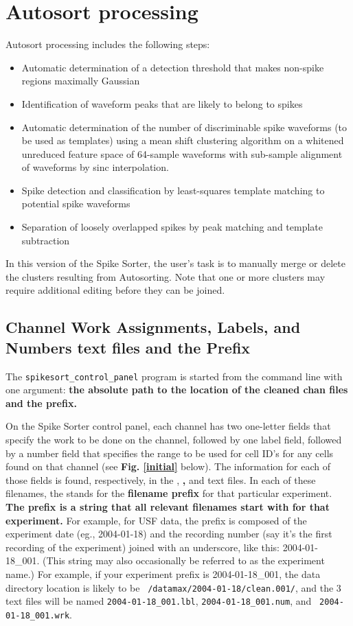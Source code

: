 \documentclass[12pt]{article}
\begin{document}
\section {Autosort processing}

Autosort processing includes the following steps:
\begin{itemize}
\item Automatic determination of a detection threshold that makes
  non-spike regions maximally Gaussian
\item Identification of waveform peaks that are likely to belong to
  spikes
\item Automatic determination of the number of discriminable spike
  waveforms (to be used as templates) using a mean shift clustering
  algorithm \citep{georgescu2003mean} on a whitened unreduced feature
  space of 64-sample waveforms with sub-sample alignment of waveforms
  by sinc interpolation.
\item Spike detection and classification by least-squares template
  matching to potential spike waveforms
\item Separation of loosely overlapped spikes by peak matching and
  template subtraction
\end{itemize}


In this version of the Spike Sorter, the user's task is to manually
merge or delete the clusters resulting from Autosorting. Note that one
or more clusters may require additional editing before they can be
joined.

\subsection {Channel Work Assignments, Labels, and Numbers text files
  and the Prefix}

The {\tt spikesort\_control\_panel} program is started from the
command line with one argument: \textbf{the absolute path to the
  location of the cleaned chan files and the prefix. }


On the Spike Sorter control panel, each channel has two one-letter
fields that specify the work to be done on the channel, followed by
one label field, followed by a number field that specifies the range
to be used for cell ID's for any cells found on that channel (see
\textbf{Fig. \ref{initial}} below). The information for each of those
fields is found, respectively, in the \textbf{},
\textbf{,} and \textbf{} text
files. In each of these filenames, the \textbf{\ttfamily{*}} stands
for the \textbf{filename prefix} for that particular
experiment. \textbf{The prefix is a string that all relevant filenames
  start with for that experiment.} For example, for USF data, the
prefix is composed of the experiment date (eg., 2004-01-18) and the
recording number (say it's the first recording of the experiment)
joined with an underscore, like this: 2004-01-18\_001. (This string
may also occasionally be referred to as the experiment name.) For
example, if your experiment prefix is 2004-01-18\_001, the data
directory location is likely to be {\tt
  /datamax/2004-01-18/clean.001/}, and the 3 text files will be named
{\tt 2004-01-18\_001.lbl}, {\tt 2004-01-18\_001.num}, and {\tt
  2004-01-18\_001.wrk}.
\end{document}

